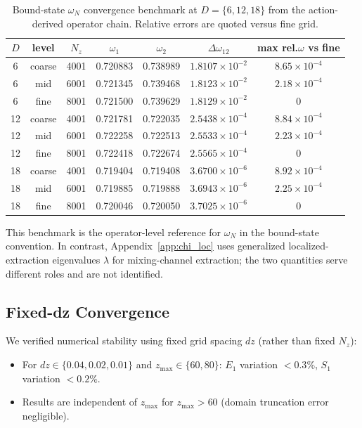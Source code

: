 \documentclass[aps,prd,onecolumn,notitlepage,nofootinbib,superscriptaddress,11pt,floatfix]{revtex4-2}
\begin{document}
\begin{table}[htbp]
\centering
\caption{Bound-state $\omega_N$ convergence benchmark at $D=\{6,12,18\}$ from the action-derived operator chain. Relative errors are quoted versus fine grid.}
\label{tab:omega_exact_conv}
\begin{tabular}{ccccccc}
\hline\hline
$D$ & level & $N_z$ & $\omega_1$ & $\omega_2$ & $\Delta\omega_{12}$ & max rel.$\omega$ vs fine \\
\hline
6  & coarse & 4001 & 0.720883 & 0.738989 & $1.8107\times10^{-2}$ & $8.65\times10^{-4}$ \\
6  & mid    & 6001 & 0.721345 & 0.739468 & $1.8123\times10^{-2}$ & $2.18\times10^{-4}$ \\
6  & fine   & 8001 & 0.721500 & 0.739629 & $1.8129\times10^{-2}$ & $0$ \\
12 & coarse & 4001 & 0.721781 & 0.722035 & $2.5438\times10^{-4}$ & $8.84\times10^{-4}$ \\
12 & mid    & 6001 & 0.722258 & 0.722513 & $2.5533\times10^{-4}$ & $2.23\times10^{-4}$ \\
12 & fine   & 8001 & 0.722418 & 0.722674 & $2.5565\times10^{-4}$ & $0$ \\
18 & coarse & 4001 & 0.719404 & 0.719408 & $3.6700\times10^{-6}$ & $8.92\times10^{-4}$ \\
18 & mid    & 6001 & 0.719885 & 0.719888 & $3.6943\times10^{-6}$ & $2.25\times10^{-4}$ \\
18 & fine   & 8001 & 0.720046 & 0.720050 & $3.7025\times10^{-6}$ & $0$ \\
\hline\hline
\end{tabular}
\end{table}

This benchmark is the operator-level reference for $\omega_N$ in the bound-state convention. In contrast, Appendix~\ref{app:chi_loc} uses generalized localized-extraction eigenvalues $\lambda$ for mixing-channel extraction; the two quantities serve different roles and are not identified.

\subsection{Fixed-dz Convergence}
\label{app:convergence}

We verified numerical stability using fixed grid spacing $dz$ (rather than fixed $N_z$):
\begin{itemize}
\item For $dz \in \{0.04, 0.02, 0.01\}$ and $z_{\max} \in \{60, 80\}$: $E_1$ variation $< 0.3\%$, $S_1$ variation $< 0.2\%$.
\item Results are independent of $z_{\max}$ for $z_{\max} > 60$ (domain truncation error negligible).
\end{itemize}
\end{document}
